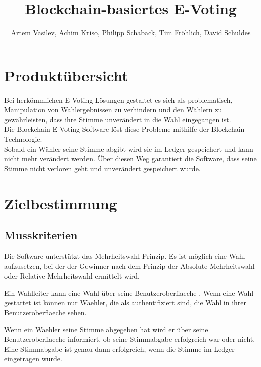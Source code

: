 \documentclass[parskip=full,11pt,twoside]{scrartcl}
\title{Blockchain-basiertes E-Voting}
\author{Artem Vasilev, Achim Kriso, Philipp Schaback, Tim Fröhlich, David Schuldes}
\begin{document}
\maketitle

\pagebreak

\tableofcontents
\pagebreak
\section{Produktübersicht}

Bei herkömmlichen E-Voting Lösungen gestaltet es sich als problematisch, Manipulation von Wahlergebnissen zu verhindern und den Wählern zu gewährleisten, dass ihre Stimme unverändert in die Wahl eingegangen ist. \\
Die Blockchain E-Voting Software löst diese Probleme mithilfe der Blockchain-Technologie. \\
Sobald ein Wähler seine Stimme abgibt wird sie im \gls{Ledger} gespeichert und kann nicht mehr verändert werden. Über diesen Weg garantiert die Software, dass seine Stimme nicht verloren geht und unverändert gespeichert wurde.

\section{Zielbestimmung}

\subsection{Musskriterien}

Die Software unterstützt das Mehrheitswahl-Prinzip. Es ist möglich eine Wahl aufzusetzen, bei der der Gewinner nach dem Prinzip der \gls{Absolute-Mehrheitswahl} oder \gls{Relative-Mehrheitswahl} ermittelt wird.

Ein \gls{Wahlleiter} kann eine \gls{Wahl} über seine \gls{Benutzeroberflaeche} .
Wenn eine \gls{Wahl} gestartet ist können nur \gls{Waehler}, die als  authentifiziert sind, die \gls{Wahl} in ihrer \gls{Benutzeroberflaeche} sehen.

Wenn ein \gls{Waehler} seine \gls{Stimme} abgegeben hat wird er über seine \gls{Benutzeroberflaeche} informiert, ob seine \gls{Stimmabgabe} erfolgreich war oder nicht. Eine \gls{Stimmabgabe} ist genau dann erfolgreich, wenn die \gls{Stimme} im \gls{Ledger} eingetragen wurde.
\end{document}
